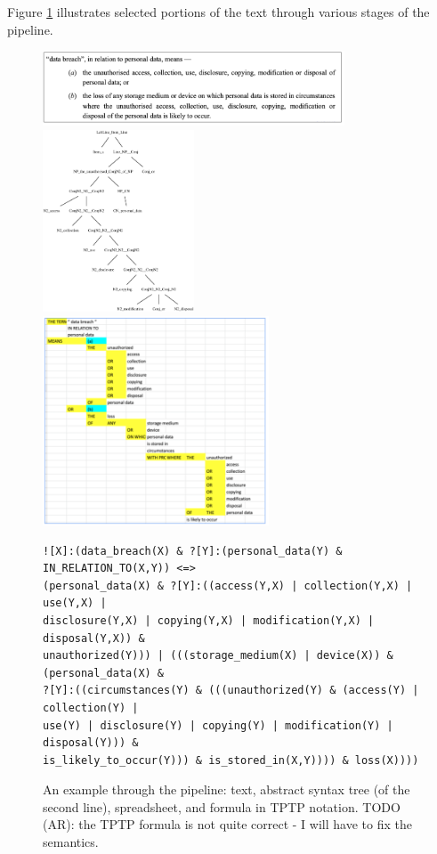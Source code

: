 \documentclass{IOS-Book-Article}
\begin{document}
Figure \ref{pipeline-ex} illustrates selected portions of the text through various stages of the pipeline.

\begin{figure}
\includegraphics[width=0.8\textwidth]{text.png}
\includegraphics[width=0.4\textwidth]{tree.eps}
\includegraphics[width=0.6\textwidth]{assembly.png}
\small
\begin{verbatim}
![X]:(data_breach(X) & ?[Y]:(personal_data(Y) & IN_RELATION_TO(X,Y)) <=>
(personal_data(X) & ?[Y]:((access(Y,X) | collection(Y,X) | use(Y,X) |
disclosure(Y,X) | copying(Y,X) | modification(Y,X) | disposal(Y,X)) &
unauthorized(Y))) | (((storage_medium(X) | device(X)) & (personal_data(X) &
?[Y]:((circumstances(Y) & (((unauthorized(Y) & (access(Y) | collection(Y) |
use(Y) | disclosure(Y) | copying(Y) | modification(Y) | disposal(Y))) &
is_likely_to_occur(Y))) & is_stored_in(X,Y)))) & loss(X))))
\end{verbatim}
\normalsize
\caption{An example through the pipeline: text, abstract syntax tree (of the second line), spreadsheet, and formula in TPTP notation.
TODO (AR): the TPTP formula is not quite correct - I will have to fix the semantics.
}
\label{pipeline-ex}
\end{figure}
\end{document}
